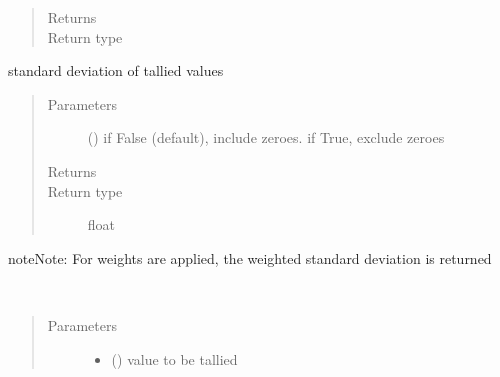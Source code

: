 \documentclass[letterpaper,10pt,english]{sphinxmanual}
\begin{document}
\begin{fulllineitems}
\begin{fulllineitems}
\begin{quote}
\begin{description}
\begin{itemize}
\end{itemize}

\item[{Returns}] \leavevmode
{}

\item[{Return type}] \leavevmode
{\hyperref[\detokenize{Reference:salabim.Monitor}]{}}

\end{description}\end{quote}

\end{fulllineitems}


\begin{fulllineitems}
\label{\detokenize{Reference:salabim.Monitor.std}}
standard deviation of tallied values
\begin{quote}\begin{description}
\item[{Parameters}] \leavevmode
{} () \textendash{} if False (default), include zeroes. if True, exclude zeroes

\item[{Returns}] \leavevmode
{}

\item[{Return type}] \leavevmode
float

\end{description}\end{quote}

\begin{sphinxadmonition}{note}{Note:}
For weights are applied, the weighted standard deviation is returned
\end{sphinxadmonition}

\end{fulllineitems}


\begin{fulllineitems}
\label{\detokenize{Reference:salabim.Monitor.tally}}~\begin{quote}\begin{description}
\item[{Parameters}] \leavevmode\begin{itemize}
\item {} 
 (\sphinxstyleliteralemphasis{, }\sphinxstyleliteralemphasis{, }) \textendash{} value to be tallied


\end{itemize}
\end{description}
\end{quote}
\end{fulllineitems}
\end{fulllineitems}
\end{document}
